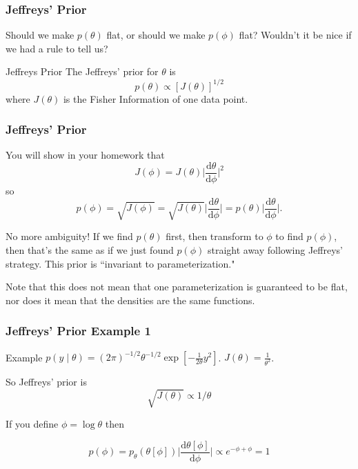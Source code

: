 \documentclass{beamer}
\begin{document}

\begin{frame}[fragile]
\frametitle{Jeffreys' Prior}

Should we make $p(\theta)$ flat, or should we make $p(\phi)$ flat? Wouldn't it be nice if we had a rule to tell us? 
\newline


\begin{block}{Jeffreys Prior}
The Jeffreys' prior for $\theta$ is 
\[
p(\theta) \propto [J(\theta)]^{1/2}
\]
where $J(\theta)$ is the Fisher Information of one data point.
\end{block}

\end{frame}


\begin{frame}[fragile]
\frametitle{Jeffreys' Prior}

You will show in your homework that 
\[
J(\phi) = J(\theta) \bigg\rvert \frac{\text{d}\theta}{ \text{d}\phi } \bigg\rvert^2
\]
so 
\[
p(\phi) = \sqrt{J(\phi)} = \sqrt{J(\theta)} \bigg\rvert \frac{\text{d}\theta}{ \text{d}\phi } \bigg\rvert = p(\theta) \bigg\rvert \frac{\text{d}\theta}{ \text{d}\phi } \bigg\rvert.
\]


No more ambiguity! If we find $p(\theta)$ first, then transform to $\phi$ to find $p(\phi)$, then that's the same as if we just found $p(\phi)$ straight away following Jeffreys' strategy. This prior is ``invariant to parameterization." 
\newline

Note that this does not mean that one parameterization is guaranteed to be flat, nor does it mean that the densities are the same functions.

\end{frame}


\begin{frame}[fragile]
\frametitle{Jeffreys' Prior Example 1}

Example $p(y \mid \theta) = (2\pi)^{-1/2}  \theta^{-1/2} \exp\left[-\frac{1}{2\theta}y^2 \right]$. $J(\theta) = \frac{1}{\theta^2}$. 
\newline

So Jeffreys' prior is 
\[
\sqrt{J(\theta)} \propto 1/\theta
\]

If you define $\phi = \log \theta $ then

\[
p(\phi) = p_{\theta}( \theta[\phi]) \bigg\rvert \frac{\text{d} \theta[\phi]}{ \text{d} \phi} \bigg\rvert \propto e^{-\phi + \phi} = 1
\]

\end{frame}
\end{document}
